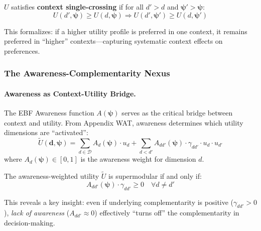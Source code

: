 \begin{definition}
\label{def:context-scp}
$U$ satisfies \textbf{context single-crossing} if for all $d' > d$ and 
$\boldsymbol{\psi}' > \boldsymbol{\psi}$:
\begin{equation}
U(d', \boldsymbol{\psi}) \geq U(d, \boldsymbol{\psi}) \Rightarrow 
U(d', \boldsymbol{\psi}') \geq U(d, \boldsymbol{\psi}')
\end{equation}
\end{definition}

This formalizes: if a higher utility profile is preferred in one context, it remains 
preferred in ``higher'' contexts---capturing systematic context effects on preferences.

\subsubsection{The Awareness-Complementarity Nexus}

\paragraph{Awareness as Context-Utility Bridge.}

The EBF Awareness function $A(\boldsymbol{\psi})$ serves as the critical bridge 
between context and utility. From Appendix WAT, awareness determines which utility 
dimensions are ``activated'':
\begin{equation}
\tilde{U}(\mathbf{d}, \boldsymbol{\psi}) = \sum_{d \in \mathcal{D}} 
A_d(\boldsymbol{\psi}) \cdot u_d + 
\sum_{d < d'} A_{dd'}(\boldsymbol{\psi}) \cdot \gamma_{dd'} \cdot u_d \cdot u_{d'}
\label{eq:awareness-utility}
\end{equation}
where $A_d(\boldsymbol{\psi}) \in [0,1]$ is the awareness weight for dimension $d$.

\begin{proposition}
\label{prop:awareness-super}
The awareness-weighted utility $\tilde{U}$ is supermodular if and only if:
\begin{equation}
A_{dd'}(\boldsymbol{\psi}) \cdot \gamma_{dd'} \geq 0 \quad \forall d \neq d'
\end{equation}
\end{proposition}

This reveals a key insight: even if underlying complementarity is positive 
($\gamma_{dd'} > 0$), \emph{lack of awareness} ($A_{dd'} \approx 0$) effectively 
``turns off'' the complementarity in decision-making.

